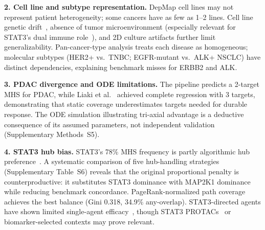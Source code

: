 \documentclass[times, twoside, watermark]{zHenriquesLab-StyleBioRxiv}
\begin{document}
\textbf{2. Cell line and subtype representation.} DepMap cell lines may not represent patient heterogeneity; some cancers have as few as 1--2 lines. Cell line genetic drift~\cite{BenDavid2018}, absence of tumor microenvironment (especially relevant for STAT3's dual immune role~\cite{Yu2009STAT3immunity,Kortylewski2005}), and 2D culture artifacts further limit generalizability. Pan-cancer-type analysis treats each disease as homogeneous; molecular subtypes (HER2+ vs.\ TNBC; EGFR-mutant vs.\ ALK+ NSCLC) have distinct dependencies, explaining benchmark misses for ERBB2 and ALK.

\textbf{3. PDAC divergence and ODE limitations.} The pipeline predicts a 2-target MHS for PDAC, while Liaki et al.~\cite{Liaki2025} achieved complete regression with 3 targets, demonstrating that static coverage underestimates targets needed for durable response. The ODE simulation illustrating tri-axial advantage is a deductive consequence of its assumed parameters, not independent validation (Supplementary Methods~S5).

\textbf{4. STAT3 hub bias.} STAT3's 78\% MHS frequency is partly algorithmic hub preference~\cite{VeraLicona2013}. A systematic comparison of five hub-handling strategies (Supplementary Table~S6) reveals that the original proportional penalty is counterproductive: it substitutes STAT3 dominance with MAP2K1 dominance while reducing benchmark concordance. PageRank-normalized path coverage achieves the best balance (Gini 0.318, 34.9\% any-overlap). STAT3-directed agents have shown limited single-agent efficacy~\cite{Johnson2018,Jonker2018}, though STAT3 PROTACs~\cite{Bai2019} or biomarker-selected contexts may prove relevant.
\end{document}
